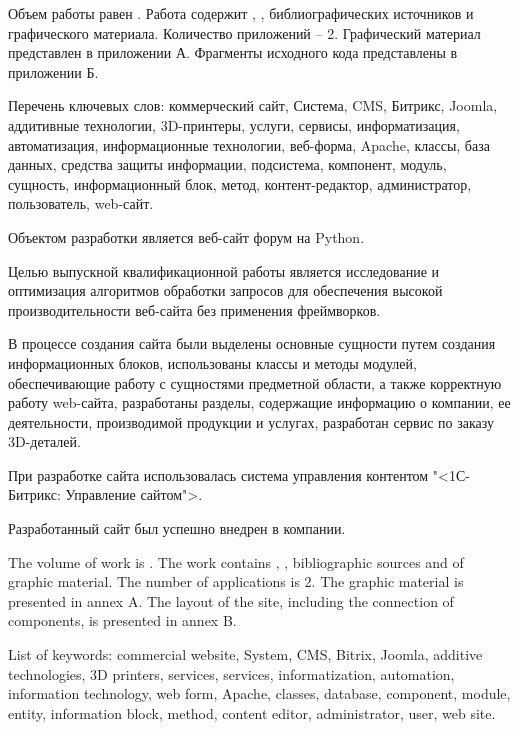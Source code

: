 
Объем работы равен . Работа содержит , ,  библиографических источников и  графического материала. Количество приложений – 2. Графический материал представлен в приложении А. Фрагменты исходного кода представлены в приложении Б.

Перечень ключевых слов: коммерческий сайт, Система, CMS, Битрикс, Joomla, аддитивные технологии, 3D-принтеры, услуги, сервисы, информатизация, автоматизация, информационные технологии, веб-форма,  Apache, классы, база данных, средства защиты информации, подсистема, компонент, модуль, сущность, информационный блок, метод, контент-редактор, администратор, пользователь, web-сайт.

Объектом разработки является веб-сайт форум на Python.

Целью выпускной квалификационной работы является исследование и оптимизация алгоритмов обработки запросов для обеспечения высокой производительности веб-сайта без применения фреймворков.

В процессе создания сайта были выделены основные сущности путем создания информационных блоков, использованы классы и методы модулей, обеспечивающие работу с сущностями предметной области, а также корректную работу web-сайта, разработаны разделы, содержащие информацию о компании, ее деятельности, производимой продукции и услугах, разработан сервис по заказу 3D-деталей.

При разработке сайта использовалась система управления контентом "<1С-Битрикс: Управление сайтом">.

Разработанный сайт был успешно внедрен в компании.

  
The volume of work is . The work contains , ,  bibliographic sources and  of graphic material. The number of applications is 2. The graphic material is presented in annex A. The layout of the site, including the connection of components, is presented in annex B.

List of keywords: commercial website, System, CMS, Bitrix, Joomla, additive technologies, 3D printers, services, services, informatization, automation, information technology, web form, Apache, classes, database, component, module, entity, information block, method, content editor, administrator, user, web site.

